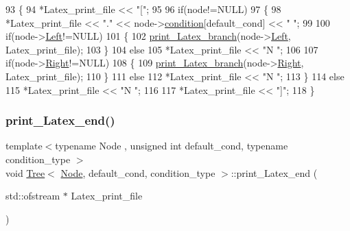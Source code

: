 \begin{DoxyCode}
93 \{
94     *Latex\_print\_file << \textcolor{stringliteral}{"["};
95     
96     \textcolor{keywordflow}{if}(node!=NULL)
97     \{
98         *Latex\_print\_file << \textcolor{stringliteral}{"."} << node->\hyperlink{struct_node_a84fa4c586396e81041eb3a4f6a46f418}{condition}[default\_cond] << \textcolor{stringliteral}{" "};
99         
100         \textcolor{keywordflow}{if}(node->\hyperlink{struct_node_a779292dace788d33114830cca763ccf3}{Left}!=NULL)
101         \{
102             \hyperlink{class_tree_a761b5da2456ff63fe51105c79135c903}{print\_Latex\_branch}(node->\hyperlink{struct_node_a779292dace788d33114830cca763ccf3}{Left}, Latex\_print\_file);
103         \}
104         \textcolor{keywordflow}{else}
105             *Latex\_print\_file << \textcolor{stringliteral}{"N "};
106         
107         \textcolor{keywordflow}{if}(node->\hyperlink{struct_node_ae5ad7032e0a9a52f5a849e33e23a7dfa}{Right}!=NULL)
108         \{
109             \hyperlink{class_tree_a761b5da2456ff63fe51105c79135c903}{print\_Latex\_branch}(node->\hyperlink{struct_node_ae5ad7032e0a9a52f5a849e33e23a7dfa}{Right}, Latex\_print\_file);
110         \}
111         \textcolor{keywordflow}{else}
112             *Latex\_print\_file << \textcolor{stringliteral}{"N "};
113     \}
114     \textcolor{keywordflow}{else}
115         *Latex\_print\_file << \textcolor{stringliteral}{"N "};
116     
117     *Latex\_print\_file << \textcolor{stringliteral}{"]"};
118 \}
\end{DoxyCode}
\mbox{\label{class_tree_a7ea34e54ff7824c3d24ce72dcb4fdbf4}} 
\subsubsection{\texorpdfstring{print\+\_\+\+Latex\+\_\+end()}{print\_Latex\_end()}}
{\footnotesize\ttfamily template$<$typename Node , unsigned int default\+\_\+cond, typename condition\+\_\+type $>$ \\
void \hyperlink{class_tree}{Tree}$<$ \hyperlink{struct_node}{Node}, default\+\_\+cond, condition\+\_\+type $>$\+::print\+\_\+\+Latex\+\_\+end (\begin{DoxyParamCaption}\item[{std\+::ofstream $\ast$}]{Latex\+\_\+print\+\_\+file }\end{DoxyParamCaption})\hspace{0.3cm}{\ttfamily [private]}}

